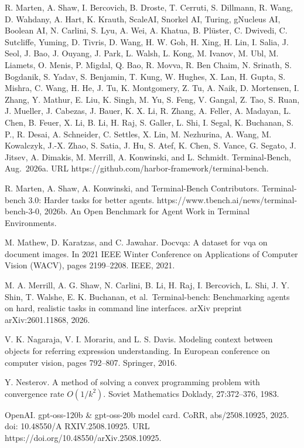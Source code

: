 R. Marten, A. Shaw, I. Bercovich, B. Droste, T. Cerruti, S. Dillmann, R.
Wang, D. Wahdany, A. Hart, K. Krauth, ScaleAI, Snorkel AI, Turing,
gNucleus AI, Boolean AI, N. Carlini, S. Lyu, A. Wei, A. Khatua, B.
Plüster, C. Dwivedi, C. Sutcliffe, Yuming, D. Tivris, D. Wang, H. W.
Goh, H. Xing, H. Lin, I. Salia, J. Seol, J. Bao, J. Ouyang, J. Park, L.
Walsh, L. Kong, M. Ivanov, M. Ubl, M. Liamets, O. Menis, P. Migdal, Q.
Bao, R. Movva, R. Ben Chaim, N. Srinath, S. Bogdanik, S. Yadav, S.
Benjamin, T. Kung, W. Hughes, X. Lan, H. Gupta, S. Mishra, C. Wang, H.
He, J. Tu, K. Montgomery, Z. Tu, A. Naik, D. Mortensen, I. Zhang, Y.
Mathur, E. Liu, K. Singh, M. Yu, S. Feng, V. Gangal, Z. Tao, S. Ruan, J.
Mueller, J. Cabezas, J. Bauer, K. X. Li, R. Zhang, A. Feller, A.
Madayan, L. Chen, B. Feuer, X. Li, B. Li, H. Raj, S. Galler, L. Shi, I.
Segal, K. Buchanan, S. P., R. Desai, A. Schneider, C. Settles, X. Lin,
M. Nezhurina, A. Wang, M. Kowalczyk, J.-X. Zhao, S. Satia, J. Hu, S.
Atef, K. Chen, S. Vance, G. Segato, J. Jitsev, A. Dimakis, M. Merrill,
A. Konwinski, and L. Schmidt. Terminal-Bench, Aug.~2026a. URL
https://github.com/harbor-framework/terminal-bench.

R. Marten, A. Shaw, A. Konwinski, and Terminal-Bench Contributors.
Terminal-bench 3.0: Harder tasks for better agents.
https://www.tbench.ai/news/terminal-bench-3-0, 2026b. An Open Benchmark
for Agent Work in Terminal Environments.

M. Mathew, D. Karatzas, and C. Jawahar. Docvqa: A dataset for vqa on
document images. In 2021 IEEE Winter Conference on Applications of
Computer Vision (WACV), pages 2199--2208. IEEE, 2021.



M. A. Merrill, A. G. Shaw, N. Carlini, B. Li, H. Raj, I. Bercovich, L.
Shi, J. Y. Shin, T. Walshe, E. K. Buchanan, et al.~Terminal-bench:
Benchmarking agents on hard, realistic tasks in command line interfaces.
arXiv preprint arXiv:2601.11868, 2026.

V. K. Nagaraja, V. I. Morariu, and L. S. Davis. Modeling context between
objects for referring expression understanding. In European conference
on computer vision, pages 792--807. Springer, 2016.

Y. Nesterov. A method of solving a convex programming problem with
convergence rate $O(1/k^2)$. Soviet Mathematics Doklady, 27:372--376, 1983.

OpenAI. gpt-oss-120b \& gpt-oss-20b model card. CoRR, abs/2508.10925,
2025. doi: 10.48550/A RXIV.2508.10925. URL
https://doi.org/10.48550/arXiv.2508.10925.

